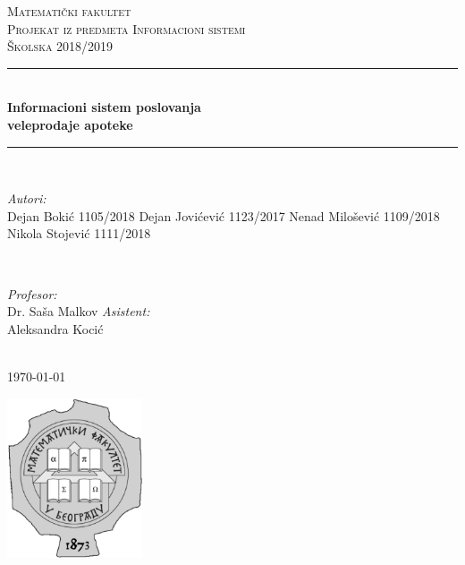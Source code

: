\begin{titlepage}

\newcommand{\HRule}{\rule{\linewidth}{0.5mm}}

\center 

\textsc{\LARGE Matematički fakultet}\\[1.5cm] 
\textsc{\Large Projekat iz predmeta Informacioni sistemi}\\[0.5cm] 
\textsc{\large Školska 2018/2019}\\[0.5cm]



\HRule \\[0.4cm]
{ \huge \bfseries Informacioni sistem poslovanja \\[0.2cm]veleprodaje apoteke}\\[0.4cm] 
\HRule \\[1.5cm]

\begin{minipage}{0.5\textwidth}
\begin{flushleft} \large
\emph{Autori:}\\
Dejan Bokić 1105/2018 \break
Dejan Jovićević 1123/2017 \break
Nenad Milošević 1109/2018 \break
Nikola Stojević 1111/2018 \break
\end{flushleft}
\end{minipage}
~
\begin{minipage}{0.4\textwidth}
\begin{flushright} \large
\emph{Profesor:} \\
Dr. Saša Malkov 
\emph{Asistent:} \\
Aleksandra Kocić 
\end{flushright}
\end{minipage}\\[1cm]

{\large \today}

\includegraphics[width=40mm]{slike/logo.jpg}\\[1cm] 
\vfill

\end{titlepage}